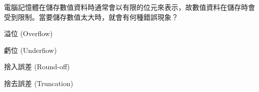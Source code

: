 \ifx\ntpcNinetyThree\undefined[93學年基北區] \fi
電腦記憶體在儲存數值資料時通常會以有限的位元來表示，故數值資料在儲存時會受到限制。當要儲存數值太大時，就會有何種錯誤現象？
  \begin{optionlist}
  \item 溢位 (Overflow)\label{ntpc-93-a11}
  \item 虧位 (Underfiow)
  \item 捨入誤差 (Round-off)
  \item 捨去誤差 (Truncation)
  \end{optionlist}